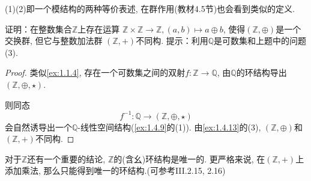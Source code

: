 \begin{remark}
    (1)(2)即一个模结构的两种等价表述, 在群作用(教材4.5节)也会看到类似的定义.
\end{remark}

\begin{problem}
    证明：在整数集合$\mathbb{Z}$上存在运算
$\mathbb{Z} \times \mathbb{Z} \to \mathbb{Z}, (a,b) \mapsto a \oplus b$,
使得$(\mathbb{Z}, \oplus)$是一个交换群, 但它与整数加法群
$(\mathbb{Z}, +)$不同构. 提示：利用$\mathbb{Q}$是可数集和上题中的问题(3).
\end{problem}

\begin{proof}
    类似\ref{ex:1.1.4}, 存在一个可数集之间的双射$f: \mathbb{Z} \to \mathbb{Q}$, 由$\mathbb{Q}$的环结构导出$(\mathbb{Z}, \oplus, \star)$.
    
    则同态
    \[
        f^{-1}: \mathbb{Q} \to (\mathbb{Z}, \oplus, \star)
    \]
    会自然诱导出一个$\mathbb{Q}$-线性空间结构(\ref{ex:1.4.9}的(1)). 由\ref{ex:1.4.13}的(3),
    $(\mathbb{Z}, \oplus)$和$(\mathbb{Z}, +)$不同构.
\end{proof}

\begin{remark}
    对于$\mathbb{Z}$还有一个重要的结论, $\mathbb{Z}$的(含幺)环结构是唯一的. 更严格来说, 在$(\mathbb{Z}, +)$上添加乘法, 那么只能得到唯一的环结构.(可参考\cite{aluffi2009algebra}III.2.15, 2.16)
\end{remark}